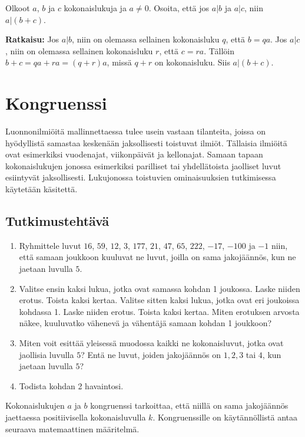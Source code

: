 \begin{esimerkki}
Olkoot $a$, $b$ ja $c$ kokonaislukuja ja $a\neq 0$. Osoita, että jos $a|b$ ja $a|c$, niin $a|(b + c)$.

{\bf Ratkaisu:}
Jos $a|b$, niin on olemassa sellainen kokonaisluku $q$, että $b = qa$.
Jos $a|c$, niin on olemassa sellainen kokonaisluku $r$, että $c = ra$.
Tällöin $b + c = qa + ra = (q + r)a$, missä $q + r$ on kokonaisluku. 
Siis $a|(b + c)$.
\end{esimerkki}


\section{Kongruenssi} 
Luonnonilmiöitä mallinnettaessa tulee usein vastaan tilanteita, joissa on hyödyllistä samastaa keskenään jaksollisesti toistuvat ilmiöt. Tällaisia ilmiöitä ovat esimerkiksi vuodenajat, viikonpäivät ja kellonajat. Samaan tapaan kokonaislukujen jonossa esimerkiksi parilliset tai yhdellätoista jaolliset luvut esiintyvät jaksollisesti. Lukujonossa toistuvien ominaisuuksien tutkimisessa käytetään  käsitettä.

\subsection*{Tutkimustehtävä}
\begin{enumerate}
\item Ryhmittele luvut $16$, $59$, $12$, $3$, $177$, $21$, $47$, $65$, $222$, $-17$, $-100$ ja $-1$ niin, että samaan joukkoon kuuluvat ne luvut, joilla on sama jakojäännös, kun ne jaetaan luvulla $5$.
\item Valitse ensin kaksi lukua, jotka ovat samassa kohdan 1 joukossa. Laske niiden erotus. Toista kaksi kertaa. Valitse sitten kaksi lukua, jotka ovat eri joukoissa kohdassa 1. Laske niiden erotus. Toista kaksi kertaa. Miten erotuksen arvosta näkee, kuuluvatko vähenevä ja vähentäjä samaan kohdan 1 joukkoon?
\item Miten voit esittää yleisessä muodossa kaikki ne kokonaisluvut, jotka ovat jaollisia luvulla $5$? Entä ne luvut, joiden jakojäännös on $1, 2, 3$ tai $4$, kun jaetaan luvulla $5$?
\item Todista kohdan 2 havaintosi.
\end{enumerate}

Kokonaislukujen $a$ ja $b$ kongruenssi tarkoittaa, että niillä on sama jakojäännös jaettaessa positiivisella kokonaisluvulla $k$. Kongruenssille on käytännöllistä antaa seuraava matemaattinen määritelmä.

